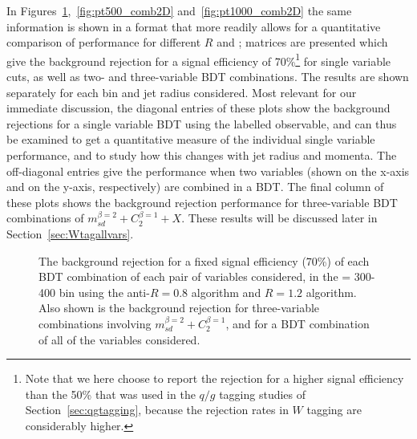  In
Figures~\ref{fig:pt300_comb2D},~\ref{fig:pt500_comb2D}
and~\ref{fig:pt1000_comb2D} the same information is shown in a format
that more readily allows for a quantitative comparison of performance
for different $R$ and \pt; matrices are presented which give the
background rejection for a signal efficiency of 70\%\footnote{Note
  that we here choose to report the rejection for a higher signal
  efficiency than the 50\% that was used in the $q/g$ tagging studies
  of Section~\ref{sec:qgtagging}, because the
rejection rates in $W$ tagging are considerably higher.} for single variable cuts, as well as two- and three-variable BDT combinations. The results are shown separately for each \pt bin and jet radius
considered.  Most relevant for our immediate discussion, the diagonal entries of these plots show the background
rejections for a single variable BDT using the labelled observable, and can thus be examined to get a
quantitative measure of the individual single variable performance,
and to study how this changes with jet radius and momenta. The off-diagonal
entries give the performance when two variables (shown on the x-axis and on the y-axis, respectively) are combined in
a BDT. The
final column of these plots shows the background rejection
performance for three-variable BDT combinations of $m_{sd}^{\beta=2} +
C_2^{\beta=1} + X$. These results will be discussed later in Section~\ref{sec:Wtagallvars}. 

\begin{figure}
\centering
{}
\caption{
The background rejection
for a fixed signal efficiency (70\%) of each BDT combination of
each pair of variables considered, in the \pt = 300-400 \GeV bin using the anti-\kT $R=0.8$
algorithm and $R=1.2$ algorithm. Also shown is the background
rejection for three-variable combinations involving $m_{sd}^{\beta=2} +
C_2^{\beta=1}$, and for a BDT combination of all of the variables considered.
}
\label{fig:pt300_comb2D}
\end{figure}


